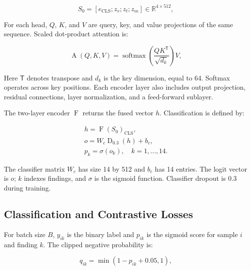 \documentclass[conference,letterpaper]{IEEEtran}
\begin{document}
\begin{equation}{S}_{0}=\left[{e}_{\mathrm{CLS}};{z}_{v};{z}_{t};{z}_{m}\right]\in{\mathbb{R}}^{4\times512},\label{eq:sequence}\end{equation}

For each head, $Q$, $K$, and $V$ are query, key, and value projections of the same sequence. Scaled dot-product attention \cite{vaswani2017} is:

\begin{equation}\operatorname{A}\left(Q,K,V\right)=\operatorname{softmax}\left(\frac{Q{K}^{\mathsf{T}}}{\sqrt{{d}_{k}}}\right)V,\label{eq:attention}\end{equation}

Here $\mathsf{T}$ denotes transpose and ${d}_{k}$ is the key dimension, equal to 64. Softmax operates across key positions. Each encoder layer also includes output projection, residual connections, layer normalization, and a feed-forward sublayer.

The two-layer encoder $\operatorname{F}$ returns the fused vector $h$. Classification is defined by:

\begin{equation}\begin{gathered}h={\operatorname{F}\left({S}_{0}\right)}_{\mathrm{CLS}},\\o={W}_{c}{\operatorname{D}}_{0.3}\left(h\right)+{b}_{c},\\{p}_{k}=\sigma\left({o}_{k}\right),\quad{}k=1,\ldots,14.\end{gathered}\label{eq:prediction}\end{equation}

The classifier matrix ${W}_{c}$ has size 14 by 512 and ${b}_{c}$ has 14 entries. The logit vector is $o$; $k$ indexes findings, and $\sigma$ is the sigmoid function. Classifier dropout is 0.3 during training.

\subsection{Classification and Contrastive Losses}

For batch size $B$, ${y}_{ik}$ is the binary label and ${p}_{ik}$ is the sigmoid score for sample $i$ and finding $k$. The clipped negative probability is:

\begin{equation}{q}_{ik}=\operatorname{min}\left(1-{p}_{ik}+0.05,1\right),\label{eq:negative}\end{equation}
\end{document}
